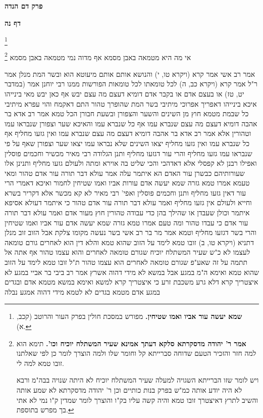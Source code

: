 \documentclass[12pt, openany]{book}
\newcommand{\sethebfont}{
\fontsize{10.5pt}{21.0pt} \selectfont
}
\newcommand{\twocol}[1]{
	{\sethebfont \begin{multicols}{2}
			#1
	\end{multicols}}	
}
\newcommand{\chapname}{}
\newcommand{\sectname}{}
\newcommand{\newchap}[1]{
	\addcontentsline{toc}{chapter}{#1}
	\renewcommand{\chapname}{#1}
		\begin{center}
			\textbf{%
\fontsize{16pt}{16pt}\selectfont
				#1}
		\end{center}
}
\newcommand{\newsection}[1]{
	\addcontentsline{toc}{section}{#1}
	\renewcommand{\sectname}{#1}	
	\vspace{-\baselineskip}
	\begin{center}
		\textbf{%
\fontsize{16pt}{16pt}\selectfont
			#1}
	\end{center}
	\vspace{-\baselineskip}
	\nopagebreak
}
\newcommand{\footnotecomment}[1]{\footnote{#1}}
\newcommand{\commenta}[1]{\footnotecomment{#1}}
\begin{document}
\newchap{פרק  דם הנדה}

\newsection{דף נה}
\twocol{
\commenta{\textbf{שמא יעשה עור אביו ואמו שטיחין.}  מפורש במסכת חולין בפרק העור והרוטב (קכב, א). }

אי מה היא מטמאה באבן מסמא אף מדוה נמי מטמאה באבן מסמא 
\commenta{\textbf{אמר ר' יהודה מדסקרתא סלקא דעתך אמינא שעיר המשתלח יוכיח וכו'.}  תימא הוא למה חזר והזכיר הטעם שדוחה סברייתא קל וחומר שלו ולמה הוצרך לומר כן לפי שאלתנו זובו טמא למה לי.\par  ויש לומר שזו הברייתא השגויה למעלה שעיר המשתלח יוכיח לא היתה שנויה בבה"מ ורבא לא היה יודע אותה כמ"ש בפרק בנות כותיים וכן ר' יהודה מדסקרתא לא שמע אותה והשיב לתרץ דאיצטרך זובו טמא והיה קשה עליו בק"ו והוצרך לומר שמדין ק"ו נמי לא אתי בך מפרש בתוספת. }

אמר רב אשי  אמר קרא (ויקרא טו, י) והנושא אותם אותם מיעוטא הוא
ובשר המת מנלן  אמר ר"ל  אמר קרא (ויקרא כב, ה) לכל טומאתו לכל טומאות הפורשות ממנו 
רבי יוחנן אמר  (במדבר יט, טז) או בעצם אדם או בקבר אדם דומיא דעצם מה עצם יבש אף כאן יבש 
מאי בינייהו  איכא בינייהו דאפריך אפרוכי 
מיתיבי  בשר המת שהופרך טהור  התם דאקמח והוי עפרא 
מיתיבי  כל שבמת מטמא חוץ מן השינים והשער והצפורן  ובשעת חבורן הכל טמא 
אמר רב אדא בר אהבה  דומיא דעצם מה עצם שנברא עמו אף כל שנברא עמו  והאיכא שער וצפורן שנבראו עמו וטהורין 
אלא אמר רב אדא בר אהבה  דומיא דעצם מה עצם שנברא עמו ואין גזעו מחליף אף כל שנברא עמו ואין גזעו מחליף  יצאו השינים שלא נבראו עמו  יצאו שער וצפורן שאף על פי שנבראו עמו גזעו מחליף 
והרי עור דגזעו מחליף ותנן  הגלודה רבי מאיר מכשיר  וחכמים פוסלין  ואפילו רבנן לא קפסלי אלא דאדהכי והכי שליט בה אוירא ומתה ולעולם גזעו מחליף  ותנינן  אלו שעורותיהם כבשרן עור האדם 
הא איתמר עלה אמר עולא  דבר תורה עור אדם טהור  ומאי טעמא אמרו טמא גזרה שמא יעשה אדם עורות אביו ואמו שטיחין לחמור 
ואיכא דאמרי  הרי עור דאין גזעו מחליף ותנן וחכמים פוסלין  ואפי' רבי מאיר לא קא מכשר אלא דקריר בשרא וחייא ולעולם אין גזעו מחליף ואמר עולא  דבר תורה עור אדם טהור 
כי איתמר דעולא אסיפא איתמר  וכולן שעבדן או שהילך בהן כדי עבודה טהורין חוץ מעור אדם  ואמר עולא  דבר תורה עור אדם כי עבדו טהור  ומה טעם אמרו טמא גזרה שמא יעשה אדם עור אביו ואמו שטיחין 
והרי בשר דגזעו מחליף וטמא  אמר מר בר רב אשי  בשר נעשה מקומו צלקת
אבל הזוב זוב מנלן  דתניא  (ויקרא טו, ב) זובו טמא לימד על הזוב שהוא טמא 
והלא דין הוא לאחרים גורם טומאה לעצמו לא כ"ש  שעיר המשתלח יוכיח שגורם טומאה לאחרים והוא עצמו טהור  אף אתה אל תתמה על זה שאע"פ שגורם טומאה לאחרים הוא עצמו טהור  ת"ל  זובו טמא לימד על הזוב שהוא טמא 
ואימא  ה"מ במגע אבל במשא לא מידי דהוה אשרץ  אמר רב ביבי בר אביי  במגע לא איצטריך קרא דלא גרע משכבת זרע
כי איצטריך קרא למשא  ואימא  במשא מטמא אדם ובגדים  במגע אדם מטמא בגדים לא לטמא מידי דהוה אמגע נבלה 
}
\end{document}
